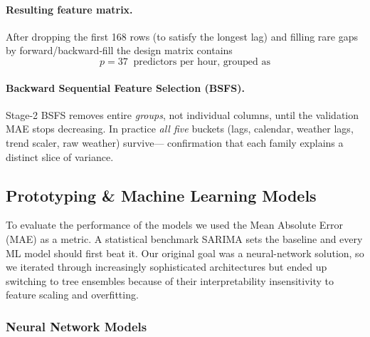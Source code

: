 \paragraph{Resulting feature matrix.}
After dropping the first 168 rows (to satisfy the longest lag) and filling
rare gaps by forward/backward‐fill the design matrix contains
\[
p = 37 \;\; \text{predictors per hour, grouped as}
\]

\paragraph{Backward Sequential Feature Selection (BSFS).}%
\label{par:bsfs}
Stage-2 BSFS removes entire \emph{groups}, not individual columns, until the
validation MAE stops decreasing.  In practice \emph{all five} buckets
(lags, calendar, weather lags, trend scaler, raw weather) survive—
confirmation that each family explains a distinct slice of variance.


\subsection{Prototyping \& Machine Learning Models}
\label{subsec:model-pool}

To evaluate the performance of the models we used the Mean Absolute Error (MAE) as a metric.
A statistical benchmark SARIMA sets the baseline and every ML model should first beat it.
Our original goal was a neural-network solution, so we iterated through increasingly
sophisticated architectures but ended up switching to tree ensembles because of their 
interpretability insensitivity to feature scaling and overfitting.

\subsubsection*{Neural Network Models}

